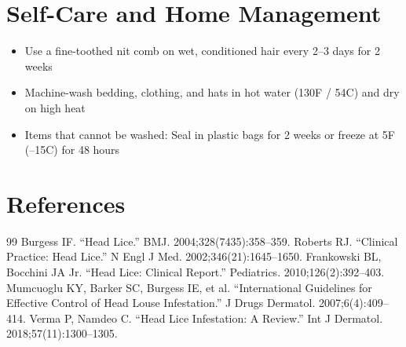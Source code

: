 \section*{Self-Care and Home Management}
\begin{itemize}
  \item Use a fine-toothed nit comb on wet, conditioned hair every 2--3 days for 2 weeks
  \item Machine-wash bedding, clothing, and hats in hot water (130\textdegree{}F / 54\textdegree{}C) and dry on high heat
  \item Items that cannot be washed: Seal in plastic bags for 2 weeks or freeze at 5\textdegree{}F (--15\textdegree{}C) for 48 hours
\end{itemize}

\section*{References}
\begin{thebibliography}{99}
 Burgess IF. ``Head Lice.'' BMJ. 2004;328(7435):358--359.
 Roberts RJ. ``Clinical Practice: Head Lice.'' N Engl J Med. 2002;346(21):1645--1650.
 Frankowski BL, Bocchini JA Jr. ``Head Lice: Clinical Report.'' Pediatrics. 2010;126(2):392--403.
 Mumcuoglu KY, Barker SC, Burgess IE, et al. ``International Guidelines for Effective Control of Head Louse Infestation.'' J Drugs Dermatol. 2007;6(4):409--414.
 Verma P, Namdeo C. ``Head Lice Infestation: A Review.'' Int J Dermatol. 2018;57(11):1300--1305.
\end{thebibliography}
